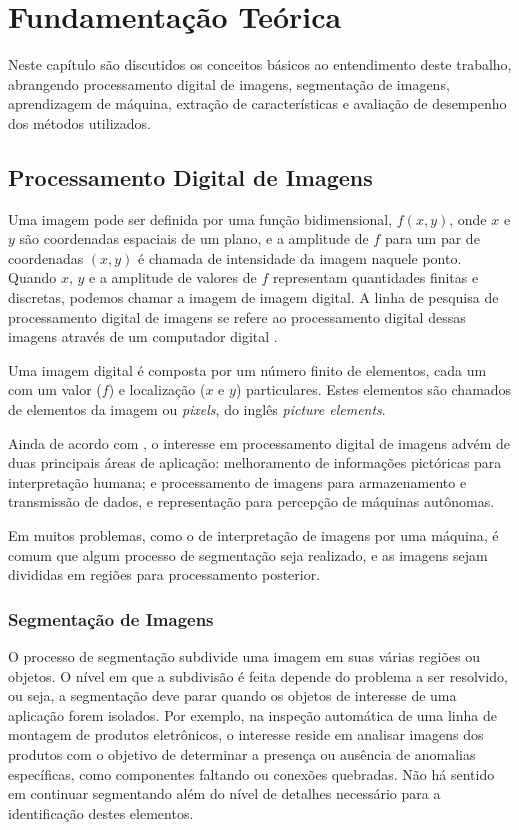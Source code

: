 \chapter{Fundamentação Teórica}\label{cap:fundamentacao}

Neste capítulo são discutidos os conceitos básicos ao entendimento deste trabalho, abrangendo processamento digital de imagens, segmentação de imagens, aprendizagem de máquina, extração de características e avaliação de desempenho dos métodos utilizados.

\section{Processamento Digital de Imagens}

Uma imagem pode ser definida por uma função bidimensional, $f(x,y)$, onde $x$ e $y$ são coordenadas espaciais de um plano, e a amplitude de $f$ para um par de coordenadas $(x,y)$ é chamada de intensidade da imagem naquele ponto. Quando $x$, $y$ e a amplitude de valores de $f$ representam quantidades finitas e discretas, podemos chamar a imagem de imagem  digital. A linha de pesquisa de processamento digital de imagens se refere ao processamento digital dessas imagens através de um computador digital \cite{gonzalez:2002}.

Uma imagem digital é composta por um número finito de elementos, cada um com um valor ($f$) e localização ($x$ e $y$) particulares. Estes elementos são chamados de elementos da imagem ou \textit{pixels}, do inglês \textit{picture elements}.

Ainda de acordo com , o interesse em processamento digital de imagens advém de duas principais áreas de aplicação: melhoramento de informações pictóricas para interpretação humana; e processamento de imagens para armazenamento e transmissão de dados, e representação para percepção de máquinas autônomas. 

Em muitos problemas, como o de interpretação de imagens por uma máquina, é comum que algum processo de segmentação seja realizado, e as imagens sejam divididas em regiões para processamento posterior.

\subsection{Segmentação de Imagens}

O processo de segmentação subdivide uma imagem em suas várias regiões ou objetos. O nível em que a subdivisão é feita depende do problema a ser resolvido, ou seja, a segmentação deve parar quando os objetos de interesse de uma aplicação forem isolados. Por exemplo, na inspeção automática de uma linha de montagem de produtos eletrônicos, o interesse reside em analisar imagens dos produtos com o objetivo de determinar a presença ou ausência de anomalias específicas, como componentes faltando ou conexões quebradas. Não há sentido em continuar segmentando além do nível de detalhes necessário para a identificação destes elementos.

